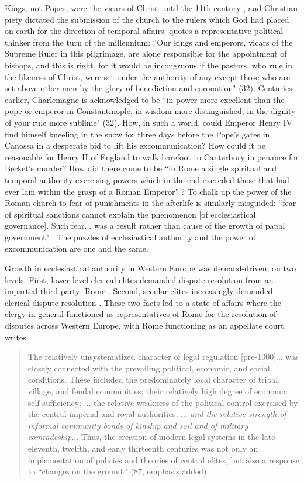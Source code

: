 \documentclass[12pt]{article}
\theoremstyle{definition}
\theoremstyle{remark}
\begin{document}
Kings, not Popes, were the vicars of Christ until the 11th century \citep[32]{southern_1970}, and Christian piety dictated the submission of the church to the rulers which God had placed on earth for the direction of temporal affairs. \citet{southern_1970} quotes a representative political thinker from the turn of the millennium: ``Our kings and emperors, vicars of the Supreme Ruler in this pilgrimage, are alone responsible for the appointment of bishops, and this is right, for it would be incongruous if the pastors, who rule in the likeness of Christ, were set under the authority of any except those who are set above other men by the glory of benediction and coronation" (32). Centuries earlier, Charlemagne is acknowledged to be ``in power more excellent than the pope or emperor in Constantinople, in wisdom more distinguished, in the dignity of your rule more sublime" (32). How, in such a world, could Emperor Henry IV find himself kneeling in the snow for three days before the Pope's gates in Canossa in a desperate bid to lift his excommunication? How could it be reasonable for Henry II of England to walk barefoot to Canterbury in penance for Becket's murder? How did there come to be ``in Rome a single spiritual and temporal authority exercising powers which in the end exceeded those that had ever lain within the grasp of a Roman Emperor" \citep[25]{southern_1970}? To chalk up the power of the Roman church to fear of punishments in the afterlife is similarly misguided: ``fear of spiritual sanctions cannot explain the phenomenon [of ecclesiastical governance]. Such fear... was a result rather than cause of the growth of papal government" \citep[25]{davray_2023}. The puzzles of ecclesiastical authority and the power of excommunication are one and the same.

Growth in ecclesiastical authority in Western Europe was demand-driven, on two levels. First, lower level clerical elites demanded dispute resolution from an impartial third party: Rome \citep{davray_2023}. Second, secular elites increasingly demanded clerical dispute resolution \citep{davray_2010}. These two facts led to a state of affairs where the clergy in general functioned as representatives of Rome for the resolution of disputes across Western Europe, with Rome functioning as an appellate court. \citet{berman_1983} writes

\begin{quote}
    The relatively unsystematized character of legal regulation [pre-1000]... was closely connected with the prevailing political, economic, and social conditions. These included the predominately local character of tribal, village, and feudal communities; their relatively high degree of economic self-sufficiency; ... the relative weakness of the political control exercised by the central imperial and royal authorities; ... \textit{and the relative strength of informal community bonds of kinship and soil and of military comradeship}... Thus, the creation of modern legal systems in the late eleventh, twelfth, and early thirteenth centuries was not only an implementation of policies and theories of central elites, but also a response to ``changes on the ground." (87, emphasis added)
\end{quote}
\end{document}
